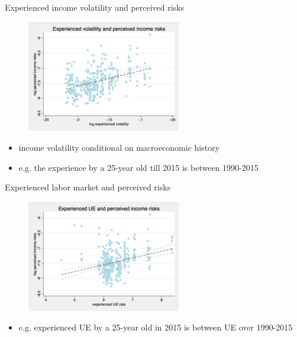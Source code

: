 \documentclass{beamer}
\begin{document}
\begin{frame}{Experienced income volatility and perceived risks}
	\begin{figure}
		\centering 
		\label{experience_var_var_var}
		\includegraphics[width=0.6\textwidth]{figures/experience_var_var_data.png}
	\end{figure}
	\begin{itemize}
		\item income volatility conditional on macroeconomic history \cite{storesletten2004cyclical}
		\item e.g. the experience by a 25-year old till 2015 is between 1990-2015
	\end{itemize}
\end{frame}

\begin{frame}{Experienced labor market and perceived risks}
		\begin{figure}
				\centering 
				\label{experience_ue_var}
				\includegraphics[width=0.6\textwidth]{figures/experience_ue_var_data.png}
			\end{figure}
	\begin{itemize}
		\item e.g. experienced UE by a 25-year old in 2015 is between UE over 1990-2015

	\end{itemize}
\end{frame}
\end{document}
